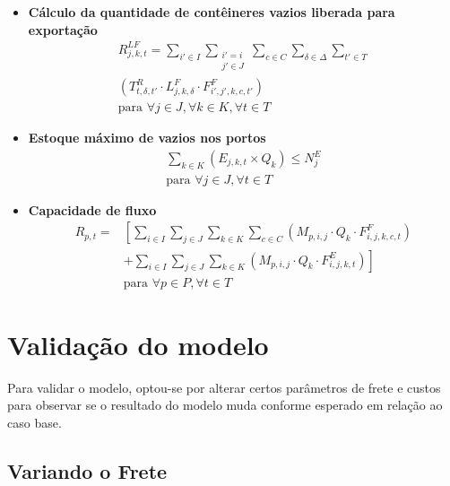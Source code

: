 \documentclass[preprint,10pt,5p]{elsarticle}
\begin{document}
\begin{itemize}
\item\textbf{Cálculo da quantidade de contêineres vazios liberada para exportação}
\begin{multline}
\label{eq:vazios-liberados-exportacao}
R_{j,k,t}^{LF} = \sum_{i' \in I} \sum_{\substack{i' = i \\ j' \in J}} \sum_{c \in C} \sum_{\delta \in \Delta} \sum_{t' \in T} \\
\left( T_{t, \delta, t'}^{R} \cdot L_{j, k, \delta}^{F} \cdot F_{i', j', k, c, t'}^{F} \right) \\
\text{para } \forall j \in J, \forall k \in K, \forall t \in T
\end{multline}

\item\textbf{Estoque máximo de vazios nos portos}
\begin{multline}
\label{eq:estoque-maximo}
\sum_{k \in K} \left( E_{j,k,t} \times Q_{k} \right) \leq N_{j}^{E} \\
\text{para } \forall j \in J, \forall t \in T
\end{multline}

\item\textbf{Capacidade de fluxo}
\begin{equation}
\label{eq:capacidade-fluxo}
\begin{aligned}
R_{p,t} = & \left[
\sum_{i \in I} \sum_{j \in J} \sum_{k \in K} \sum_{c \in C} \left( M_{p,i,j} \cdot Q_{k} \cdot F_{i,j,k,c,t}^{F} \right) \right. \\
& + \left. \sum_{i \in I} \sum_{j \in J} \sum_{k \in K} \left( M_{p,i,j} \cdot Q_{k} \cdot F_{i,j,k,t}^{E} \right)
\right] \\
& \text{para } \forall p \in P, \forall t \in T
\end{aligned}
\end{equation}


\end{itemize}


\section{Validação do modelo}

Para validar o modelo, optou-se por alterar certos parâmetros de frete e custos para observar se o resultado do modelo muda conforme esperado em relação ao caso base.

\subsection{Variando o Frete}
\end{document}
